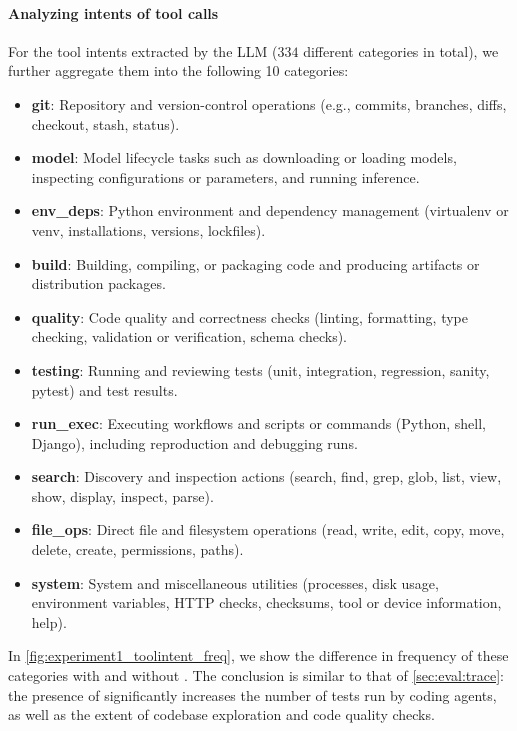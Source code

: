 \paragraph{Analyzing intents of tool calls}
For the tool intents extracted by the LLM ($334$ different categories in total), we further aggregate them into the following 10 categories:
\begin{itemize}
  \item \textbf{git}: Repository and version-control operations (e.g., commits, branches, diffs, checkout, stash, status).
  \item \textbf{model}: Model lifecycle tasks such as downloading or loading models, inspecting configurations or parameters, and running inference.
  \item \textbf{env\_deps}: Python environment and dependency management (virtualenv or venv, installations, versions, lockfiles).
  \item \textbf{build}: Building, compiling, or packaging code and producing artifacts or distribution packages.
  \item \textbf{quality}: Code quality and correctness checks (linting, formatting, type checking, validation or verification, schema checks).
  \item \textbf{testing}: Running and reviewing tests (unit, integration, regression, sanity, pytest) and test results.
  \item \textbf{run\_exec}: Executing workflows and scripts or commands (Python, shell, Django), including reproduction and debugging runs.
  \item \textbf{search}: Discovery and inspection actions (search, find, grep, glob, list, view, show, display, inspect, parse).
  \item \textbf{file\_ops}: Direct file and filesystem operations (read, write, edit, copy, move, delete, create, permissions, paths).
  \item \textbf{system}: System and miscellaneous utilities (processes, disk usage, environment variables, HTTP checks, checksums, tool or device information, help).
\end{itemize}
In \cref{fig:experiment1_toolintent_freq}, we show the difference in frequency of these categories with and without \agentsmds{}.
The conclusion is similar to that of \cref{sec:eval:trace}: the presence of \agentsmds{} significantly increases the number of tests run by coding agents, as well as the extent of codebase exploration and code quality checks.
\vspace{-0.1in}

